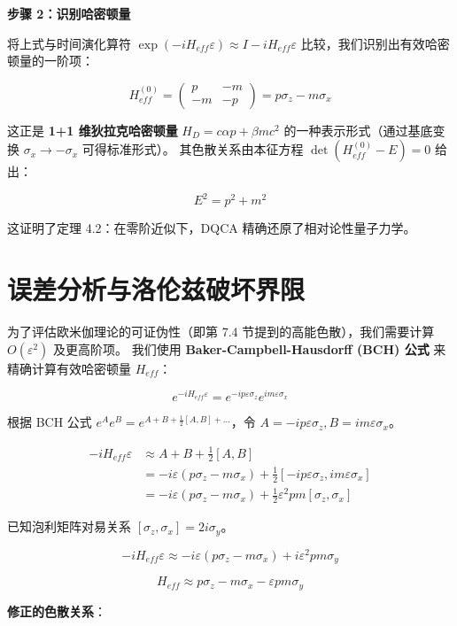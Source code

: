 \textbf{步骤 2：识别哈密顿量}

将上式与时间演化算符 $\exp(-i H_{eff} \varepsilon) \approx I - i H_{eff} \varepsilon$ 比较，我们识别出有效哈密顿量的一阶项：

\[H_{eff}^{(0)} = \begin{pmatrix} p & -m \\ -m & -p \end{pmatrix} = p \sigma_z - m \sigma_x\]

这正是 \textbf{1+1 维狄拉克哈密顿量} $H_D = c \alpha p + \beta m c^2$ 的一种表示形式（通过基底变换 $\sigma_x \to -\sigma_x$ 可得标准形式）。
其色散关系由本征方程 $\det(H_{eff}^{(0)} - E) = 0$ 给出：

\[E^2 = p^2 + m^2\]

这证明了定理 4.2：在零阶近似下，DQCA 精确还原了相对论性量子力学。

\section{误差分析与洛伦兹破坏界限}

为了评估欧米伽理论的可证伪性（即第 7.4 节提到的高能色散），我们需要计算 $O(\varepsilon^2)$ 及更高阶项。
我们使用 \textbf{Baker-Campbell-Hausdorff (BCH) 公式} 来精确计算有效哈密顿量 $H_{eff}$：

\[e^{-i H_{eff} \varepsilon} = e^{-i p \varepsilon \sigma_z} e^{i m \varepsilon \sigma_x}\]

根据 BCH 公式 $e^A e^B = e^{A+B + \frac{1}{2}[A,B] + \dots}$，令 $A = -i p \varepsilon \sigma_z, B = i m \varepsilon \sigma_x$。

\[\begin{aligned}
-i H_{eff} \varepsilon &\approx A + B + \frac{1}{2} [A, B] \\
&= -i\varepsilon (p \sigma_z - m \sigma_x) + \frac{1}{2} [-i p \varepsilon \sigma_z, i m \varepsilon \sigma_x] \\
&= -i\varepsilon (p \sigma_z - m \sigma_x) + \frac{1}{2} \varepsilon^2 pm [\sigma_z, \sigma_x]
\end{aligned}\]

已知泡利矩阵对易关系 $[\sigma_z, \sigma_x] = 2i \sigma_y$。

\[-i H_{eff} \varepsilon \approx -i\varepsilon (p \sigma_z - m \sigma_x) + i \varepsilon^2 pm \sigma_y\]

\[H_{eff} \approx p \sigma_z - m \sigma_x - \varepsilon pm \sigma_y\]

\textbf{修正的色散关系}：

